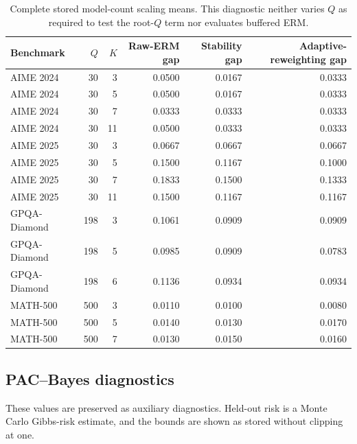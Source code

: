 \begin{table}[t]
\centering
\small
\begin{tabular}{lrrrrr}
\toprule
Benchmark & \(Q\) & \(K\) & Raw-ERM gap & Stability gap & Adaptive-reweighting gap \\
\midrule
AIME 2024 & 30 & 3 & 0.0500 & 0.0167 & 0.0333 \\
AIME 2024 & 30 & 5 & 0.0500 & 0.0167 & 0.0333 \\
AIME 2024 & 30 & 7 & 0.0333 & 0.0333 & 0.0333 \\
AIME 2024 & 30 & 11 & 0.0500 & 0.0333 & 0.0333 \\
\midrule
AIME 2025 & 30 & 3 & 0.0667 & 0.0667 & 0.0667 \\
AIME 2025 & 30 & 5 & 0.1500 & 0.1167 & 0.1000 \\
AIME 2025 & 30 & 7 & 0.1833 & 0.1500 & 0.1333 \\
AIME 2025 & 30 & 11 & 0.1500 & 0.1167 & 0.1167 \\
\midrule
GPQA-Diamond & 198 & 3 & 0.1061 & 0.0909 & 0.0909 \\
GPQA-Diamond & 198 & 5 & 0.0985 & 0.0909 & 0.0783 \\
GPQA-Diamond & 198 & 6 & 0.1136 & 0.0934 & 0.0934 \\
\midrule
MATH-500 & 500 & 3 & 0.0110 & 0.0100 & 0.0080 \\
MATH-500 & 500 & 5 & 0.0140 & 0.0130 & 0.0170 \\
MATH-500 & 500 & 7 & 0.0130 & 0.0150 & 0.0160 \\
\bottomrule
\end{tabular}
\caption{Complete stored model-count scaling means.  This diagnostic neither varies \(Q\) as required to test the root-\(Q\) term nor evaluates buffered ERM.}
\label{tab:legacy-full-k-scaling}
\end{table}

\subsection{PAC--Bayes diagnostics}

These values are preserved as auxiliary diagnostics.  Held-out risk is a Monte Carlo Gibbs-risk estimate, and the bounds are shown as stored without clipping at one.

